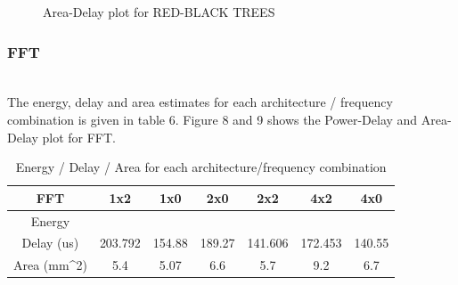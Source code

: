 \documentclass[a4paper, twoside]{article}      %
\begin{document}
\begin{figure}[h!]
{\centering {} \par}
\caption{Area-Delay plot for RED-BLACK TREES}
\end{figure}



\subsubsection{FFT}
\\
The energy, delay and area estimates for each architecture / frequency combination is given in table 6.
Figure 8 and 9 shows the Power-Delay and Area-Delay plot for FFT.

\begin{table}[h!]
\caption{Energy / Delay / Area for each architecture/frequency combination}
\begin{center}
{\begin{tabular}{|c | c |  c |  c  | c  |  c |  c|}
\hline
FFT &1x2 &1x0 &2x0 &2x2 &4x2 &4x0 \\ [1ex]
\hline
Energy &&&&&& \\ [1ex]
\hline
Delay (us)& 203.792& 154.88& 189.27& 141.606& 172.453& 140.55\\[1ex] \hline
Area (mm^2)& 5.4& 5.07 & 6.6& 5.7& 9.2& 6.7\\[1ex]
\hline

\end{tabular}}
\label{diffstruc}
\end{center}
\end{table}
\end{document}

